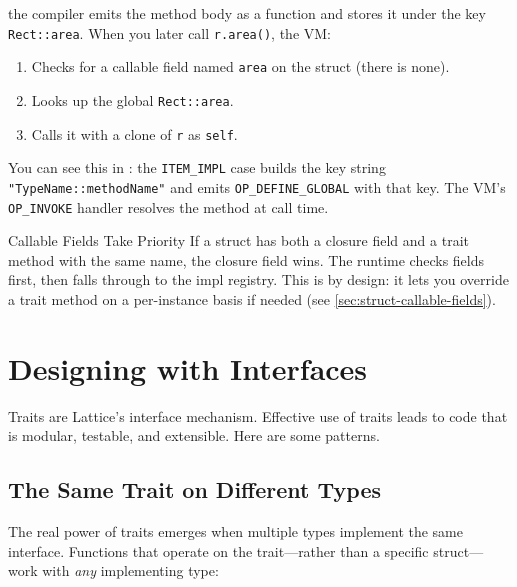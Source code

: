 the compiler emits the method body as a function and stores it under the
key \texttt{Rect::area}. When you later call \lstinline|r.area()|, the VM:

\begin{enumerate}
  \item Checks for a callable field named \lstinline|area| on the struct
    (there is none).
  \item Looks up the global \texttt{Rect::area}.
  \item Calls it with a clone of \lstinline|r| as \lstinline|self|.
\end{enumerate}

You can see this in : the \texttt{ITEM\_IMPL}
case builds the key string \lstinline|"TypeName::methodName"| and emits
\texttt{OP\_DEFINE\_GLOBAL} with that key. The VM's \texttt{OP\_INVOKE}
handler resolves the method at call time.

\begin{notebox}{Callable Fields Take Priority}
If a struct has both a closure field and a trait method with the same name,
the closure field wins. The runtime checks fields first, then falls through
to the impl registry. This is by design: it lets you override a trait
method on a per-instance basis if needed (see \cref{sec:struct-callable-fields}).
\end{notebox}

\section{Designing with Interfaces}\label{sec:trait-design}

Traits are Lattice's interface mechanism. Effective use of traits leads to
code that is modular, testable, and extensible. Here are some patterns.

\subsection{The Same Trait on Different Types}

The real power of traits emerges when multiple types implement the same
interface. Functions that operate on the trait---rather than a specific
struct---work with \emph{any} implementing type:

